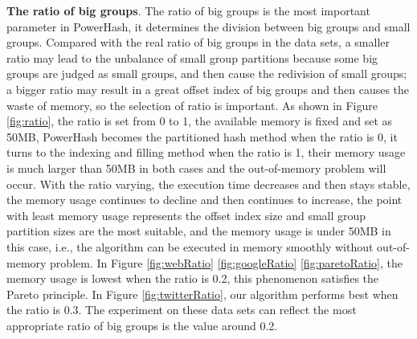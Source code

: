 \textbf{The ratio of big groups}. The ratio of big groups is the most important parameter in PowerHash, it determines the division between big groups and small groups. Compared with the real ratio of big groups in the data sets, a smaller ratio may lead to the unbalance of small group partitions because some big groups are judged as small groups, and then cause the redivision of small groups; a bigger ratio may result in a great offset index of big groups and then causes the waste of memory, so the selection of ratio is important. As shown in Figure \ref{fig:ratio}, the ratio is set from 0 to 1, the available memory is fixed and set as 50MB, PowerHash becomes the partitioned hash method when the ratio is 0, it turns to the indexing and filling method when the ratio is 1, their memory usage is much larger than 50MB in both cases and the out-of-memory problem will occur. With the ratio varying, the execution time decreases and then stays stable, the memory usage continues to decline and then continues to increase, the point with least memory usage represents the offset index size and small group partition sizes are the most suitable, and the memory usage is under 50MB in this case, i.e., the algorithm can be executed in memory smoothly without out-of-memory problem. In Figure \ref{fig:webRatio} \ref{fig:googleRatio} \ref{fig:paretoRatio}, the memory usage is lowest when the ratio is 0.2, this phenomenon satisfies the Pareto principle. In Figure \ref{fig:twitterRatio}, our algorithm performs best when the ratio is 0.3. The experiment on these data sets can reflect the most appropriate ratio of big groups is the value around 0.2.
 
